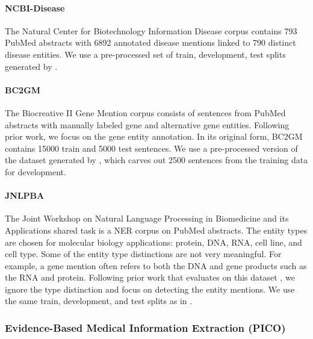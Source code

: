 \documentclass[acmlarge,screen,nonacm]{acmart}
\begin{document}
\paragraph{NCBI-Disease} The Natural Center for Biotechnology Information Disease corpus \cite{dougan2014ncbi} contains 793 PubMed abstracts with 6892 annotated disease mentions linked to 790 distinct disease entities. We use a pre-processed set of train, development, test splits generated by \citet{crichton2017neural}.

\paragraph{BC2GM} The Biocreative II Gene Mention corpus \cite{smith2008overview} consists of sentences from PubMed abstracts with manually labeled gene and alternative gene entities. Following prior work, we focus on the gene entity annotation. In its original form, BC2GM contains 15000 train and 5000 test sentences. We use a pre-processed version of the dataset generated by \citet{crichton2017neural}, which carves out 2500 sentences from the training data for development.

\paragraph{JNLPBA} The Joint Workshop on Natural Language Processing in Biomedicine and its Applications shared task \cite{collier-kim-2004-introduction} is a NER corpus on PubMed abstracts. The entity types are chosen for molecular biology applications: protein, DNA, RNA, cell line, and cell type. 
Some of the entity type distinctions are not very meaningful. For example, a gene mention often refers to both the DNA and gene products such as the RNA and protein. 
Following prior work that evaluates on this dataset \cite{lee2019bioberts}, we ignore the type distinction and focus on detecting the entity mentions. 
We use the same train, development, and test splits as in \citet{crichton2017neural}.

\subsubsection{Evidence-Based Medical Information Extraction (PICO)}
\end{document}
